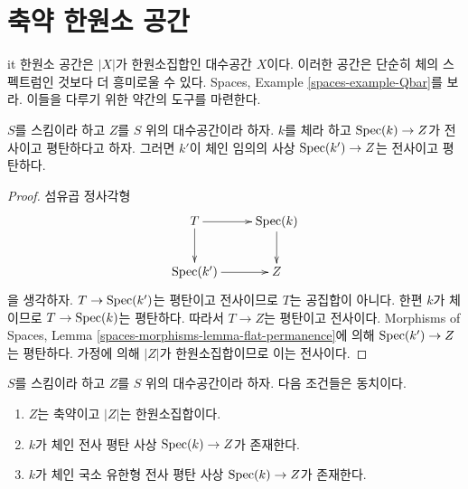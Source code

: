 \section{축약 한원소 공간}
\label{section-singleton}

\noindent
{it 한원소} 공간은 $|X|$가 한원소집합인 대수공간 $X$이다. 이러한
공간은 단순히 체의 스펙트럼인 것보다 더 흥미로울 수 있다. Spaces,
Example \ref{spaces-example-Qbar}를 보라. 이들을 다루기 위한 약간의
도구를 마련한다.

\begin{lemma}
\label{lemma-flat-cover-by-field}
$S$를 스킴이라 하고 $Z$를 $S$ 위의 대수공간이라 하자. $k$를 체라
하고 $\mathop{\mathrm{Spec}}(k) \to Z$가 전사이고 평탄하다고 하자. 그러면 $k'$이 체인
임의의 사상 $\mathop{\mathrm{Spec}}(k') \to Z$는 전사이고 평탄하다.
\end{lemma}

\begin{proof}
섬유곱 정사각형
$$
\xymatrix{
T \ar[d] \ar[r] & \Spec(k) \ar[d] \\
\Spec(k') \ar[r] & Z
}
$$
을 생각하자. $T \to \mathop{\mathrm{Spec}}(k')$는 평탄이고 전사이므로 $T$는
공집합이 아니다. 한편 $k$가 체이므로 $T \to \mathop{\mathrm{Spec}}(k)$는 평탄하다.
따라서 $T \to Z$는 평탄이고 전사이다. Morphisms of Spaces, Lemma
\ref{spaces-morphisms-lemma-flat-permanence}에 의해
$\mathop{\mathrm{Spec}}(k') \to Z$는 평탄하다. 가정에 의해 $|Z|$가 한원소집합이므로
이는 전사이다.
\end{proof}

\begin{lemma}
\label{lemma-unique-point}
$S$를 스킴이라 하고 $Z$를 $S$ 위의 대수공간이라 하자. 다음 조건들은
동치이다.
\begin{enumerate}
\item $Z$는 축약이고 $|Z|$는 한원소집합이다.
\item $k$가 체인 전사 평탄 사상 $\mathop{\mathrm{Spec}}(k) \to Z$가 존재한다.
\item $k$가 체인 국소 유한형 전사 평탄 사상
$\mathop{\mathrm{Spec}}(k) \to Z$가 존재한다.
\end{enumerate}
\end{lemma}

